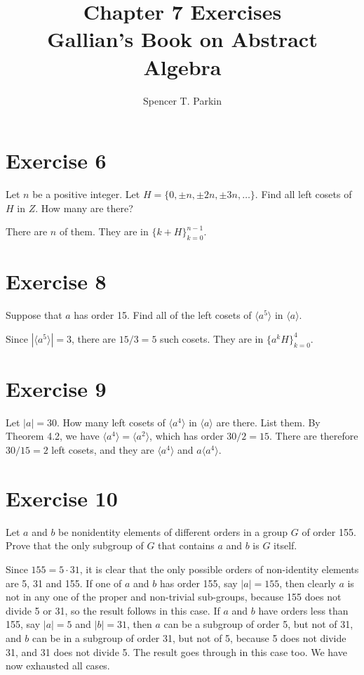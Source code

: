 \documentclass[12pt]{article}
\title{Chapter 7 Exercises\\Gallian's Book on Abstract Algebra}
\author{Spencer T. Parkin}
\begin{document}
\maketitle

\section*{Exercise 6}

Let $n$ be a positive integer.  Let $H=\{0,\pm n, \pm 2n, \pm 3n, \dots\}$.
Find all left cosets of $H$ in $Z$.  How many are there?

There are $n$ of them.  They are in $\{k+H\}_{k=0}^{n-1}$.

\section*{Exercise 8}

Suppose that $a$ has order 15.  Find all of the left cosets of $\langle a^5\rangle$ in $\langle a\rangle$.

Since $|\langle a^5\rangle|=3$, there are $15/3=5$ such cosets.  They are in $\{a^kH\}_{k=0}^4$.

\section*{Exercise 9}

Let $|a|=30$.  How many left cosets of $\langle a^4\rangle$ in $\langle a\rangle$ are there.  List them.
By Theorem 4.2, we have $\langle a^4\rangle=\langle a^2\rangle$, which has order $30/2=15$.
There are therefore $30/15=2$ left cosets, and they are $\langle a^4\rangle$ and $a\langle a^4\rangle$.

\section*{Exercise 10}

Let $a$ and $b$ be nonidentity elements of different orders in a group $G$ of
order 155.  Prove that the only subgroup of $G$ that contains $a$ and $b$ is $G$ itself.

Since $155=5\cdot 31$, it is clear that the only possible orders of non-identity elements
are 5, 31 and 155.
 If one of $a$ and $b$ has order 155, say $|a|=155$, then
clearly $a$ is not in any one of the proper and non-trivial sub-groups,
because 155 does not divide 5 or 31,
so the result follows in this case.
If $a$ and $b$ have orders less than 155, say $|a|=5$ and $|b|=31$,
then $a$ can be a subgroup of order 5, but not of 31, and $b$ can
be in a subgroup of order 31, but not of 5, because 5 does not divide 31, and
31 does not divide 5.  The result goes through in this case too.
We have now exhausted all cases.
\end{document}

